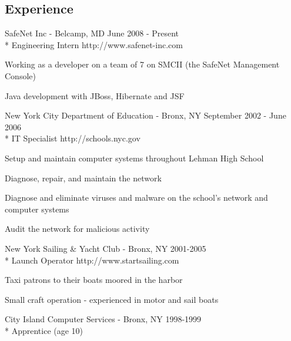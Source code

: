 \documentclass[margin,line]{resume}
\begin{document}
\begin{resume}
\section{\mysidestyle Experience}
	\begin{compactdesc}
		\item[SafeNet Inc] - Belcamp, MD \hfill {\small June 2008 - Present}
		\\* Engineering Intern \hfill {\footnotesize http://www.safenet-inc.com}
		\begin{compactitem}
			\item {\small Working as a developer on a team of 7 on SMCII (the
			SafeNet Management Console)}
			\item {\small Java development with JBoss, Hibernate and JSF}
		\end{compactitem}
		\item[New York City Department of Education] - Bronx, NY \hfill
		{\small September 2002 - June 2006}
		\\* IT Specialist \hfill {\footnotesize http://schools.nyc.gov}
		\begin{compactitem}
			\item {\small Setup and maintain computer systems throughout Lehman
			High School}
			\item {\small Diagnose, repair, and maintain the network}
			\item {\small Diagnose and eliminate viruses and malware on the
			school's network and computer systems}
			\item {\small Audit the network for malicious activity}
		\end{compactitem}

		\item[New York Sailing \& Yacht Club] - Bronx, NY \hfill {\small
		2001-2005}
		\\* Launch Operator \hfill {\footnotesize http://www.startsailing.com}
		\begin{compactitem}
			\item {\small Taxi patrons to their boats moored in the harbor}
			\item {\small Small craft operation - experienced in motor and sail
			boats}
		\end{compactitem}

		\item[City Island Computer Services] - Bronx, NY \hfill {\small
		1998-1999}
		\\* Apprentice (age 10)
	\end{compactdesc}


\end{resume}
\end{document}
